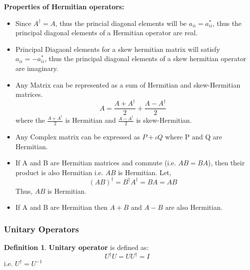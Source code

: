 \documentclass[12pt, oneside]{book}
\theoremstyle{definition}
\newtheorem{definition}{Definition}[section]
\theoremstyle{definition}
\theoremstyle{remark}
\begin{document}
\textbf{Properties of Hermitian operators: }
\begin{itemize}
    \item Since $A^{\dagger}=A$, thus the princial diagonal elements will be $a_{ii}=a_{ii}^*$, thus the principal diagonal elements of a Hermitian operator are real.
    \item Principal Diagaonl elements for a skew hermitian matrix will satisfy $a_{ii}=-a_{ii}^*$, thus the principal diagonal elements of a skew hermitian operator are imaginary.
    \item Any Matrix can be represented as a sum of Hermitian and skew-Hermitian matrices.
    \[ A = \frac{A+A^{\dagger}}{2} + \frac{A-A^{\dagger}}{2} \] 
    where the $\frac{A + A^{\dagger}}{2}$ is Hermitian and $\frac{A-A^{\dagger}}{2}$ is skew-Hermitian.
    \item Any Complex matrix can be expressed as $P+ \iota Q$ where P and Q are Hermitian.
    \item If A and B are Hermitian matrices and commute (i.e. $AB=BA$), then their product is also Hermitian i.e. $AB$ is Hermitian.
    Let,
    \[ (AB)^{\dagger}=B^{\dagger}A^{\dagger}=BA=AB \]
    Thus, $AB$ is Hermitian.
    \item If A and B are Hermitian then $A+B$ and $A-B$ are also Hermitian.
\end{itemize}

\subsubsection{Unitary Operators}\label{subsubsec:Unitary Operators}
\begin{definition}
\textbf{Unitary operator} is defined as:
\[U^{\dagger}U=UU^{\dagger}=I\]
i.e. $U^{\dagger}=U^{-1}$\\
\end{definition}
\end{document}
